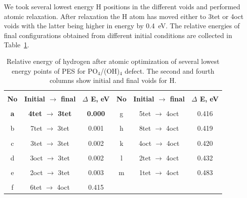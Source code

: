 We took several lowest energy H positions in the different voids and performed atomic relaxation. 
After relaxation the H atom has moved either to 3tet or 4oct voids with the latter being higher in energy by 0.4~eV. The relative energies of final configurations obtained from different initial conditions are collected  in Table~\ref{energy1}.


\begin{table}[h!]
\caption{Relative energy of hydrogen after atomic optimization of several lowest energy points of PES  for PO$_4$/(OH)$_4$ defect. The second and fourth columns show initial and final voids for H. }
\label{energy1}
\begin{center}
\begin{tabular}{|c|c|c|c|c|c|}
\hline
& & & & & \\
 \textbf{No} & \textbf{Initial $\rightarrow$ final} & \textbf{$\Delta$ E, eV} & \textbf{No} & \textbf{Initial $\rightarrow$ final} & \textbf{$\Delta$ E, eV}\\ 
\hline
& & & & & \\
\textbf{a} & \textbf{4tet $\rightarrow$ 3tet} & \textbf{0.000} & g & 5tet $\rightarrow$ 4oct & 0.416 \\
\hline
& & & & & \\
b & 7tet $\rightarrow$ 3tet & 0.001 & h & 8tet $\rightarrow$ 4oct & 0.419 \\
\hline
& & & & & \\
c & 3tet $\rightarrow$ 3tet & 0.002 & k & 4oct $\rightarrow$ 4oct & 0.420 \\
\hline
& & & & & \\
d & 3oct $\rightarrow$ 3tet & 0.002 & l & 2tet $\rightarrow$ 4oct & 0.432 \\
\hline
& & & & & \\
e & 2oct $\rightarrow$ 3tet & 0.003 & m & 1tet $\rightarrow$ 4oct & 0.483 \\
\hline
& & & & & \\
f & 6tet $\rightarrow$ 4oct & 0.415 & & & \\
\hline
\end{tabular}
\end{center}
\end{table}


